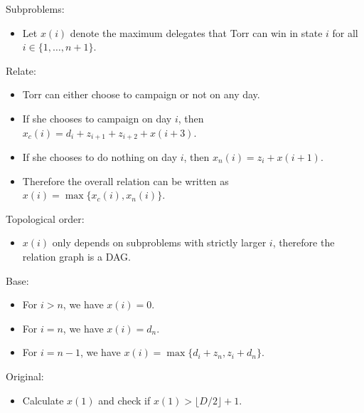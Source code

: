 \documentclass[12pt,twoside]{article}
\begin{document}


\begin{problems}

\problem  %

Subproblems:
\begin{itemize}
    \item Let $x(i)$ denote the maximum delegates that Torr can win in state $i$ for all $i \in \{1,\ldots,n+1\}$.
\end{itemize}

Relate:
\begin{itemize}
    \item Torr can either choose to campaign or not on any day.
    \item If she chooses to campaign on day $i$, then $x_c(i)=d_i+z_{i+1}+z_{i+2}+x(i+3)$.
    \item If she chooses to do nothing on day $i$, then $x_n(i)=z_i+x(i+1)$.
    \item Therefore the overall relation can be written as $x(i)=\max\{x_c(i),x_n(i)\}$.
\end{itemize}

Topological order:
\begin{itemize}
    \item $x(i)$ only depends on subproblems with strictly larger $i$, therefore the relation graph is a DAG.
\end{itemize}

Base:
\begin{itemize}
    \item For $i>n$, we have $x(i)=0$.
    \item For $i=n$, we have $x(i)=d_n$.
    \item For $i=n-1$, we have $x(i)=\max\{d_i+z_n, z_i+d_n\}$.
\end{itemize}

Original:
\begin{itemize}
    \item Calculate $x(1)$ and check if $x(1)>\lfloor D/2 \rfloor + 1$.
\end{itemize}


\end{problems}
\end{document}
